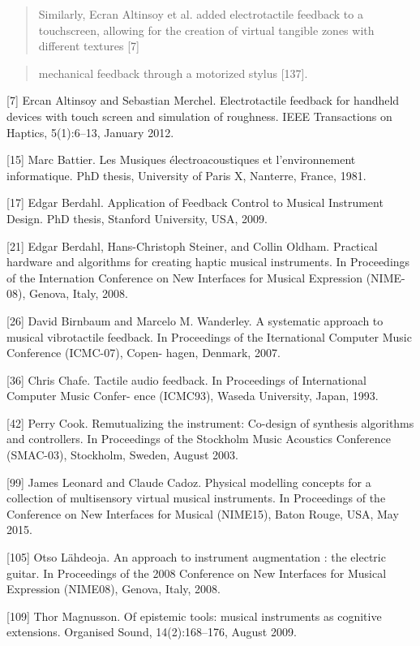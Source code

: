 \begin{quotation}
    Similarly, Ecran Altinsoy et al. added electrotactile feedback to a
    touchscreen, allowing for the creation of virtual tangible zones with
    different textures [7]
\end{quotation}


\begin{quotation}
    mechanical feedback through a motorized stylus [137].
\end{quotation}

[7] Ercan Altinsoy and Sebastian Merchel. Electrotactile feedback for handheld
devices with touch screen and simulation of roughness. IEEE Transactions on
Haptics, 5(1):6–13, January 2012.

[15] Marc Battier. Les Musiques électroacoustiques et l’environnement
informatique. PhD thesis, University of Paris X, Nanterre, France, 1981.

[17] Edgar Berdahl. Application of Feedback Control to Musical Instrument
Design. PhD thesis, Stanford University, USA, 2009.

[21] Edgar Berdahl, Hans-Christoph Steiner, and Collin Oldham. Practical
hardware and algorithms for creating haptic musical instruments. In Proceedings
of the Internation Conference on New Interfaces for Musical Expression
(NIME-08), Genova, Italy, 2008.

[26] David Birnbaum and Marcelo M. Wanderley. A systematic approach to musical
vibrotactile feedback. In Proceedings of the Iternational Computer Music
Conference (ICMC-07), Copen- hagen, Denmark, 2007.

[36] Chris Chafe. Tactile audio feedback. In Proceedings of International
Computer Music Confer- ence (ICMC93), Waseda University, Japan, 1993.

[42] Perry Cook. Remutualizing the instrument: Co-design of synthesis algorithms
and controllers. In Proceedings of the Stockholm Music Acoustics Conference
(SMAC-03), Stockholm, Sweden, August 2003.
 
[99] James Leonard and Claude Cadoz. Physical modelling concepts for a
collection of multisensory virtual musical instruments. In Proceedings of the
Conference on New Interfaces for Musical (NIME15), Baton Rouge, USA, May 2015.

[105] Otso Lähdeoja. An approach to instrument augmentation : the electric
guitar. In Proceedings of the 2008 Conference on New Interfaces for Musical
Expression (NIME08), Genova, Italy, 2008.

[109] Thor Magnusson. Of epistemic tools: musical instruments as cognitive
extensions. Organised Sound, 14(2):168–176, August 2009.

